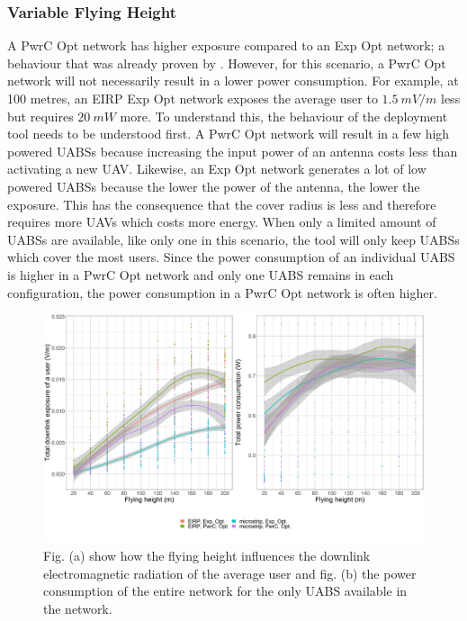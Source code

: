 \documentclass[twocolumn]{phdsymp} %
\begin{document}
\subsubsection{Variable Flying Height}
A \gls{PwrC Opt} network has higher exposure compared to an \gls{Exp Opt} network; a behaviour that was already proven by \cite{J1}. 
However, for this scenario, a \gls{PwrC Opt} network will not necessarily result in a lower power consumption. 
For example, at 100 metres, an \gls{EIRP} \gls{Exp Opt} network exposes the average 
user to $1.5\ mV/m$ less but requires $20\ mW$ more.
To understand this, the behaviour of the deployment tool needs to be understood first. 
A \gls{PwrC Opt} network will result in a few high powered \gls{UABS}s because increasing the input power of an antenna costs 
less than activating a new  \gls{UAV}. Likewise, an \gls{Exp Opt} network 
generates a lot of low powered \gls{UABS}s because the lower the power of the antenna, the lower the exposure. This has the consequence that the cover radius 
is less and therefore requires more \gls{UAV}s which costs more energy.
When only a limited amount of \gls{UABS}s are available, 
like only one in this scenario, the tool will only keep \gls{UABS}s which cover the most users. 
Since the power consumption of an individual \gls{UABS} is higher in a \gls{PwrC Opt} network and only one \gls{UABS} 
remains in each configuration,  the power consumption in a \gls{PwrC Opt} network is often higher. 
\begin{figure}[h!]
  \includegraphics[width=\linewidth]{fhvsdlAndPc_extendedAbstract.png}
  \caption{Fig. (a) show how the flying height influences the downlink electromagnetic radiation of the average user and fig. (b) the
  power consumption of the entire network for the only \acs{UABS} available in the network.}
  \label{fig:s2a_dlAndPc}
\end{figure}
\end{document}
